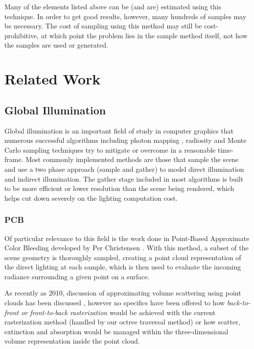 \documentclass[12pt]{ucthesis}
\begin{document}
Many of the elements listed above can be (and are) estimated using this technique.  In order to get good results, however, many hundreds of samples may be necessary.  The cost of sampling using this method may still be cost-prohibitive, at which point the problem lies in the sample method itself, not how the samples are used or generated.

\chapter{Related Work}

\section{Global Illumination}
Global illumination is an important field of study in computer graphics that numerous successful algorithms including photon mapping \cite{Jensen:2009}, radiosity \cite{radiosity} and Monte Carlo sampling techniques \cite{monte_carlo} try to mitigate or overcome in a reasonable time-frame.  Most commonly implemented methods are those that sample the scene and use a two phase approach (sample and gather) to model direct illumination and indirect illumination.  The gather stage included in most algorithms is built to be more efficient or lower resolution than the scene being rendered, which helps cut down severely on the lighting computation cost.

\subsection{PCB}
Of particular relevance to this field is the work done in Point-Based Approximate Color Bleeding developed by Per Christensen \cite{christensen:2008}.  With this method, a subset of the scene geometry is thoroughly sampled, creating a point cloud representation of the direct lighting at each sample, which is then used to evaluate the incoming radiance surrounding a given point on a surface.

As recently as 2010, discussion of approximating volume scattering using point clouds has been discussed \cite{christensen:siggraph}, however no specifics have been offered to how \textit{back-to-front or front-to-back rasterization} would be achieved with the current rasterization method (handled by our octree traversal method) or how scatter, extinction and absorption would be managed within the three-dimensional volume representation inside the point cloud.
\end{document}

